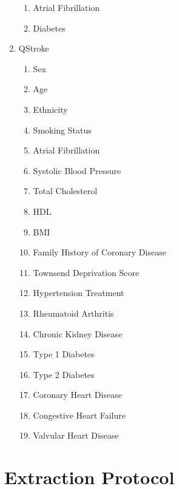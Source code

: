 \documentclass[a4paper,12pt]{article}
\begin{document}
\begin{appendices}
\begin{enumerate}
\begin{enumerate}
   				\item Atrial Fibrillation
   				\item Diabetes
   			\end{enumerate}
	   		\item QStroke
	   		\begin{enumerate}
	   			\item Sex
	   			\item Age
	   			\item Ethnicity
	   			\item Smoking Status
	   			\item Atrial Fibrillation
	   			\item Systolic Blood Pressure
	   			\item Total Cholesterol
	   			\item HDL
	   			\item BMI
	   			\item Family History of Coronary Disease
	   			\item Townsend Deprivation Score
	   			\item Hypertension Treatment
	   			\item Rheumatoid Arthritis
	   			\item Chronic Kidney Disease
	   			\item Type 1 Diabetes
	   			\item Type 2 Diabetes
	   			\item Coronary Heart Disease
	   			\item Congestive Heart Failure
	   			\item Valvular Heart Disease
	   		\end{enumerate}
   		\end{enumerate}
   		\newpage
   		
   		\section{Extraction Protocol}

\end{appendices}
\end{document}
